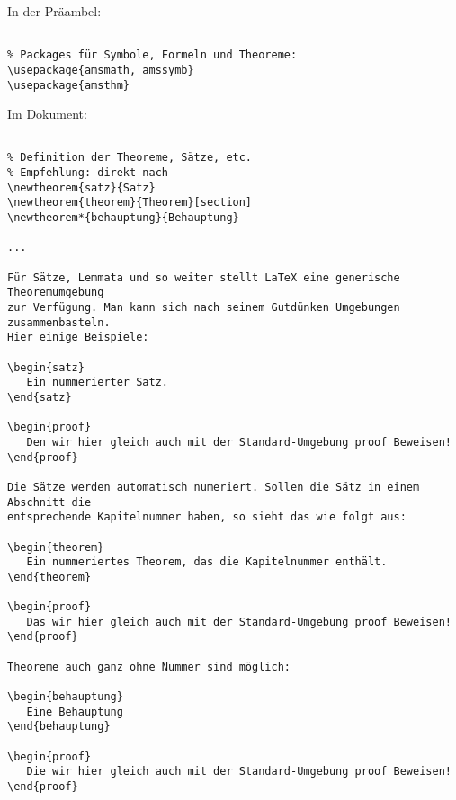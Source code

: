 
In der Präambel:

\begin{verbatim}

% Packages für Symbole, Formeln und Theoreme:
\usepackage{amsmath, amssymb}
\usepackage{amsthm}

\end{verbatim}

\tcblower

Im Dokument: 

\begin{verbatim}

% Definition der Theoreme, Sätze, etc.
% Empfehlung: direkt nach 
\newtheorem{satz}{Satz}
\newtheorem{theorem}{Theorem}[section]
\newtheorem*{behauptung}{Behauptung}

...

Für Sätze, Lemmata und so weiter stellt LaTeX eine generische Theoremumgebung 
zur Verfügung. Man kann sich nach seinem Gutdünken Umgebungen zusammenbasteln. 
Hier einige Beispiele:

\begin{satz} 
   Ein nummerierter Satz. 
\end{satz}

\begin{proof}
   Den wir hier gleich auch mit der Standard-Umgebung proof Beweisen!
\end{proof}

Die Sätze werden automatisch numeriert. Sollen die Sätz in einem Abschnitt die 
entsprechende Kapitelnummer haben, so sieht das wie folgt aus:

\begin{theorem} 
   Ein nummeriertes Theorem, das die Kapitelnummer enthält. 
\end{theorem}

\begin{proof}
   Das wir hier gleich auch mit der Standard-Umgebung proof Beweisen!
\end{proof}

Theoreme auch ganz ohne Nummer sind möglich:

\begin{behauptung}
   Eine Behauptung
\end{behauptung}

\begin{proof}
   Die wir hier gleich auch mit der Standard-Umgebung proof Beweisen!
\end{proof}

\end{verbatim}

